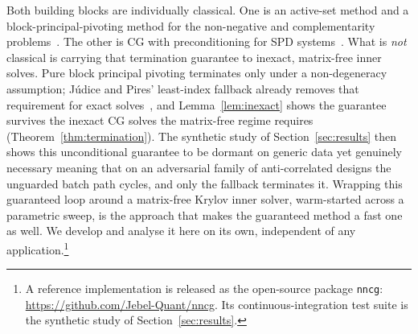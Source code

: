 Both building blocks are individually classical. One is an active-set method and a block-principal-pivoting method for the non-negative and complementarity
problems~\cite{lawson1974,judice1994,kim2011,murty1988,nocedal2006}. The other is CG with preconditioning for SPD systems~\cite{hestenes1952,golub2013,greenbaum1997,trefethenbau1997,%
benzi2005}. What is \emph{not} classical is carrying that termination guarantee to inexact, matrix-free inner solves. Pure block principal pivoting terminates only under a non-degeneracy
assumption; Júdice and Pires' least-index fallback already removes that requirement for exact solves~\cite{judice1994}, and Lemma~\ref{lem:inexact} shows the guarantee survives the inexact CG solves the matrix-free regime requires (Theorem~\ref{thm:termination}). The synthetic study of
Section~\ref{sec:results} then shows this unconditional guarantee to be dormant on generic data yet genuinely necessary meaning that on an adversarial family of anti-correlated designs the
unguarded batch path cycles, and only the fallback terminates it. Wrapping this guaranteed
loop around a matrix-free Krylov inner solver, warm-started across a parametric sweep, is the
approach that makes the guaranteed method a fast one as well. We develop and analyse it
here on its own, independent of any application.\footnote{A reference implementation is
released as the open-source package \texttt{nncg}:
\url{https://github.com/Jebel-Quant/nncg}. Its continuous-integration test suite is the
synthetic study of Section~\ref{sec:results}.}

